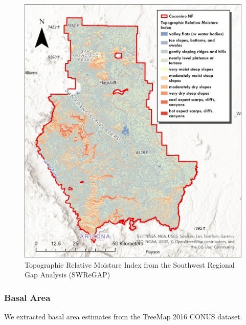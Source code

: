 \documentclass[
  number]{elsarticle}
\begin{document}
\begin{figure}[H]

{\centering \includegraphics{images/TRMI.jpg}

}

\caption{Topographic Relative Moisture Index from the Southwest Regional
Gap Analysis (SWReGAP)}

\end{figure}%

\subsubsection{Basal Area}\label{basal-area}

We extracted basal area estimates from the TreeMap 2016
\citep{riley2022} CONUS dataset.
\end{document}
